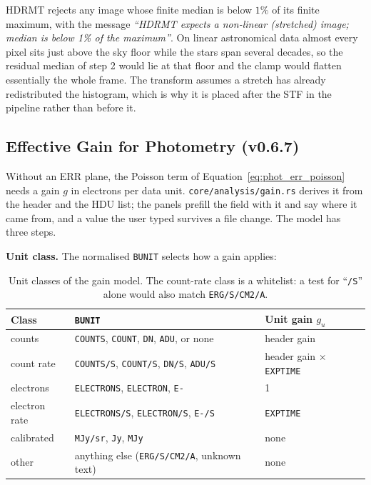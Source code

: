 \documentclass[11pt,a4paper]{article}
\newcommand{\code}[1]{\texttt{\small #1}}
\begin{document}
    \begin{notebox}
        HDRMT rejects any image whose finite median is below $1\%$ of its finite maximum, with the message \emph{``HDRMT expects a non-linear (stretched) image; median is below 1\% of the maximum''}. On linear astronomical data almost every pixel sits just above the sky floor while the stars span several decades, so the residual median of step 2 would lie at that floor and the clamp would flatten essentially the whole frame. The transform assumes a stretch has already redistributed the histogram, which is why it is placed after the STF in the pipeline rather than before it.
    \end{notebox}


    \subsection{Effective Gain for Photometry (v0.6.7)}
    \label{sec:gain_math}

    Without an ERR plane, the Poisson term of Equation~\ref{eq:phot_err_poisson} needs a gain $g$ in electrons per data unit. \code{core/analysis/gain.rs} derives it from the header and the HDU list; the panels prefill the field with it and say where it came from, and a value the user typed survives a file change. The model has three steps.

    \textbf{Unit class.} The normalised \code{BUNIT} selects how a gain applies:

    \begin{table}[H]
        \centering
        \small
        \begin{tabularx}{\textwidth}{lXl}
            \toprule
            \textbf{Class} & \textbf{\code{BUNIT}} & \textbf{Unit gain $g_u$} \\
            \midrule
            counts & \code{COUNTS}, \code{COUNT}, \code{DN}, \code{ADU}, or none & header gain \\
            count rate & \code{COUNTS/S}, \code{COUNT/S}, \code{DN/S}, \code{ADU/S} & header gain $\times$ \code{EXPTIME} \\
            electrons & \code{ELECTRONS}, \code{ELECTRON}, \code{E-} & 1 \\
            electron rate & \code{ELECTRONS/S}, \code{ELECTRON/S}, \code{E-/S} & \code{EXPTIME} \\
            calibrated & \code{MJy/sr}, \code{Jy}, \code{MJy} & none \\
            other & anything else (\code{ERG/S/CM2/A}, unknown text) & none \\
            \bottomrule
        \end{tabularx}
        \caption{Unit classes of the gain model. The count-rate class is a whitelist: a test for ``\code{/S}'' alone would also match \code{ERG/S/CM2/A}.}
    \end{table}
\end{document}
